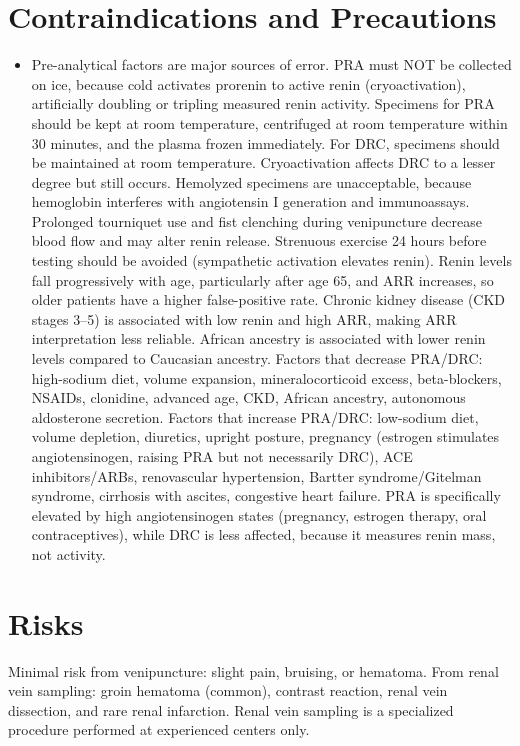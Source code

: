 \section*{Contraindications and Precautions}
\begin{itemize}
  \item Pre-analytical factors are major sources of error. PRA must NOT be collected on ice, because cold activates prorenin to active renin (cryoactivation), artificially doubling or tripling measured renin activity. Specimens for PRA should be kept at room temperature, centrifuged at room temperature within 30 minutes, and the plasma frozen immediately. For DRC, specimens should be maintained at room temperature. Cryoactivation affects DRC to a lesser degree but still occurs. Hemolyzed specimens are unacceptable, because hemoglobin interferes with angiotensin I generation and immunoassays. Prolonged tourniquet use and fist clenching during venipuncture decrease blood flow and may alter renin release. Strenuous exercise 24 hours before testing should be avoided (sympathetic activation elevates renin). Renin levels fall progressively with age, particularly after age 65, and ARR increases, so older patients have a higher false-positive rate. Chronic kidney disease (CKD stages 3--5) is associated with low renin and high ARR, making ARR interpretation less reliable. African ancestry is associated with lower renin levels compared to Caucasian ancestry. Factors that decrease PRA/DRC: high-sodium diet, volume expansion, mineralocorticoid excess, beta-blockers, NSAIDs, clonidine, advanced age, CKD, African ancestry, autonomous aldosterone secretion. Factors that increase PRA/DRC: low-sodium diet, volume depletion, diuretics, upright posture, pregnancy (estrogen stimulates angiotensinogen, raising PRA but not necessarily DRC), ACE inhibitors/ARBs, renovascular hypertension, Bartter syndrome/Gitelman syndrome, cirrhosis with ascites, congestive heart failure. PRA is specifically elevated by high angiotensinogen states (pregnancy, estrogen therapy, oral contraceptives), while DRC is less affected, because it measures renin mass, not activity.
\end{itemize}
\section*{Risks}
Minimal risk from venipuncture: slight pain, bruising, or hematoma. From renal vein sampling: groin hematoma (common), contrast reaction, renal vein dissection, and rare renal infarction. Renal vein sampling is a specialized procedure performed at experienced centers only.


